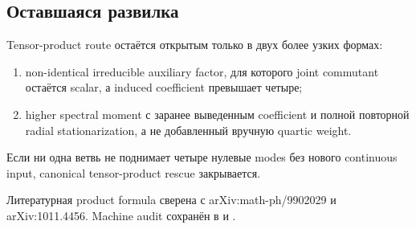 \subsection{Оставшаяся развилка}

Tensor-product route остаётся открытым только в двух более узких формах:
\begin{enumerate}
 \item non-identical irreducible auxiliary factor, для которого joint
 commutant остаётся scalar, а induced coefficient превышает четыре;
 \item higher spectral moment с заранее выведенным coefficient и полной
 повторной radial stationarization, а не добавленный вручную quartic weight.
\end{enumerate}
Если ни одна ветвь не поднимает четыре нулевые modes без нового continuous
input, canonical tensor-product rescue закрывается.

Литературная product formula сверена с arXiv:math-ph/9902029 и
arXiv:1011.4456. Machine audit сохранён в
 и
.